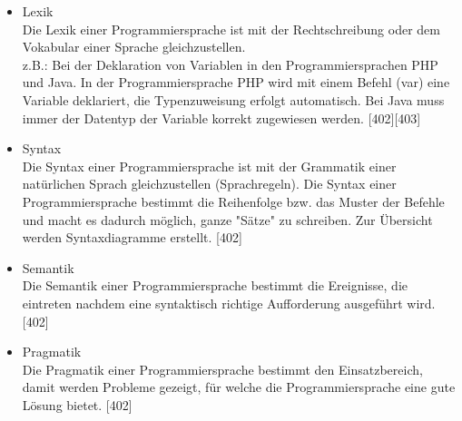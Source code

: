 \documentclass[12pt,a4paper]{report}
\begin{document}
\begin{onehalfspace}
\begin{itemize}
\item Lexik\\
Die Lexik einer Programmiersprache ist mit der Rechtschreibung oder dem Vokabular einer Sprache gleichzustellen.\\
z.B.: Bei der Deklaration von Variablen in den Programmiersprachen PHP und Java. In der Programmiersprache PHP wird mit einem Befehl (var) eine Variable deklariert, die Typenzuweisung erfolgt automatisch. Bei Java muss immer der Datentyp der Variable korrekt zugewiesen werden. [402][403]
\item Syntax\\
Die Syntax einer Programmiersprache ist mit der Grammatik einer natürlichen Sprach gleichzustellen (Sprachregeln).
Die Syntax einer Programmiersprache bestimmt die Reihenfolge bzw. das Muster der Befehle und macht es dadurch möglich, ganze "{}Sätze"{} zu schreiben. Zur Übersicht werden Syntaxdiagramme erstellt. [402]
\item Semantik\\
Die Semantik einer Programmiersprache bestimmt die Ereignisse, die eintreten nachdem eine syntaktisch richtige Aufforderung ausgeführt wird. [402]
\item Pragmatik\\
Die Pragmatik einer Programmiersprache bestimmt den Einsatzbereich, damit werden Probleme gezeigt, für welche die Programmiersprache eine gute Lösung bietet. [402]
\end{itemize}


\end{onehalfspace}
\end{document}
